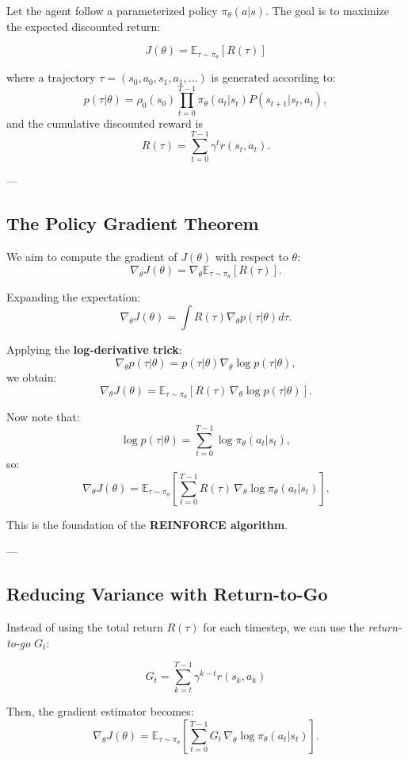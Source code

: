 \documentclass[12pt]{article}
\theoremstyle{definition} %
\theoremstyle{plain} %
\theoremstyle{remark} %
\begin{document}
\begin{CJK}{UTF8}{gbsn}
Let the agent follow a parameterized policy \(\pi_\theta(a|s)\).
The goal is to maximize the expected discounted return:

\[
J(\theta) = \mathbb{E}_{\tau \sim \pi_\theta} [ R(\tau) ]
\]

where a trajectory \(\tau = (s_0,a_0,s_1,a_1,\ldots)\) is generated according to:
\[
p(\tau|\theta) = \rho_0(s_0) \prod_{t=0}^{T-1} \pi_\theta(a_t|s_t) P(s_{t+1}|s_t,a_t),
\]
and the cumulative discounted reward is
\[
R(\tau) = \sum_{t=0}^{T-1} \gamma^t r(s_t,a_t).
\]

---

\subsection{The Policy Gradient Theorem}

We aim to compute the gradient of \(J(\theta)\) with respect to \(\theta\):
\[
\nabla_\theta J(\theta) = \nabla_\theta \mathbb{E}_{\tau \sim \pi_\theta}[R(\tau)].
\]

Expanding the expectation:
\[
\nabla_\theta J(\theta)
= \int R(\tau) \nabla_\theta p(\tau|\theta) d\tau.
\]

Applying the \textbf{log-derivative trick}:
\[
\nabla_\theta p(\tau|\theta) = p(\tau|\theta)\nabla_\theta \log p(\tau|\theta),
\]
we obtain:
\[
\nabla_\theta J(\theta)
= \mathbb{E}_{\tau \sim \pi_\theta} \left[
R(\tau)\, \nabla_\theta \log p(\tau|\theta)
\right].
\]

Now note that:
\[
\log p(\tau|\theta) = \sum_{t=0}^{T-1} \log \pi_\theta(a_t|s_t),
\]
so:
\[
\nabla_\theta J(\theta)
= \mathbb{E}_{\tau \sim \pi_\theta} \left[
\sum_{t=0}^{T-1} R(\tau)\, \nabla_\theta \log \pi_\theta(a_t|s_t)
\right].
\]

This is the foundation of the \textbf{REINFORCE algorithm}.

---

\subsection{Reducing Variance with Return-to-Go}

Instead of using the total return \(R(\tau)\) for each timestep,
we can use the \emph{return-to-go} \(G_t\):

\[
G_t = \sum_{k=t}^{T-1} \gamma^{k-t} r(s_k,a_k)
\]

Then, the gradient estimator becomes:
\[
\nabla_\theta J(\theta)
= \mathbb{E}_{\tau \sim \pi_\theta} \left[
\sum_{t=0}^{T-1} G_t\, \nabla_\theta \log \pi_\theta(a_t|s_t)
\right].
\]


\end{CJK}
\end{document}
